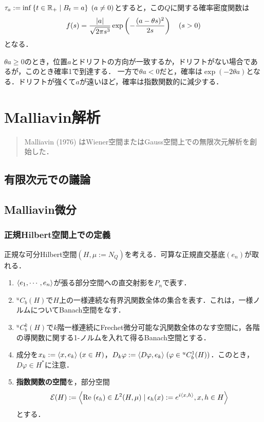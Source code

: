 \documentclass[uplatex,dvipdfmx]{jsreport}
\begin{document}
\begin{proposition}
    $\tau_a:=\inf\left\{t\in\mathbb{R}_+\mid B_t=a\right\}\;(a\ne0)$とすると，この$Q$に関する確率密度関数は
    \[f(s)=\frac{\lvert a\rvert}{\sqrt{2\pi s^3}}\exp\left(-\frac{(a-\theta s)^2}{2s}\right)\quad(s>0)\]
    となる．
\end{proposition}
\begin{remarks}
    $\theta a\ge0$のとき，位置$a$とドリフトの方向が一致するか，ドリフトがない場合であるが，このとき確率1で到達する．
    一方で$\theta a<0$だと，確率は$\exp(-2\theta a)$となる．ドリフトが強くて$a$が遠いほど，確率は指数関数的に減少する．
\end{remarks}

\chapter{Malliavin解析}

\begin{quotation}
    Malliavin (1976) はWiener空間またはGauss空間上での無限次元解析を創始した．
\end{quotation}

\section{有限次元での議論}

\section{Malliavin微分}

\subsection{正規Hilbert空間上での定義}

\begin{notation}
    正規な可分Hilbert空間$(H,\mu:=N_Q)$を考える．可算な正規直交基底$(e_n)$が取れる．
    \begin{enumerate}
        \item $\langle e_1,\cdots,e_n\rangle$が張る部分空間への直交射影を$P_n$で表す．
        \item ${}^uC_b(H)$で$H$上の一様連続な有界汎関数全体の集合を表す．これは，一様ノルムについてBanach空間をなす．
        \item ${}^uC_b^k(H)$で$k$階一様連続にFrechet微分可能な汎関数全体のなす空間に，各階の導関数に関する1-ノルムを入れて得るBanach空間とする．
        \item 成分を$x_k:=\langle x,e_k\rangle\;(x\in H)$，$D_k\varphi:=\langle D\varphi,e_k\rangle\;(\varphi\in {}^uC_b^1(H))$．このとき，$D\varphi\in H^*$に注意．
        \item \textbf{指数関数の空間}を，部分空間
        \[\mathcal{E}(H):=\left\langle\mathrm{Re}\;(\epsilon_h)\in L^2(H,\mu)\mid \epsilon_h(x):=e^{i\langle x,h\rangle},x,h\in H\right\rangle\]
        とする．
    \end{enumerate}
\end{notation}
\end{document}
